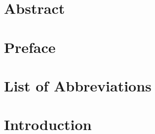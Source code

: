 \documentclass[a4paper,10pt,twoside]{report}
\author{\me}
\begin{document}
 

\normalsize



\chapter*{Abstract}\label{chapter:abstract} 



\chapter*{Preface}\label{chapter:preface}



\tableofcontents








\chapter*{List of Abbreviations}



\chapter{Introduction}\label{chapter:introduction}
\setcounter{page}{0}


%
\end{document}
